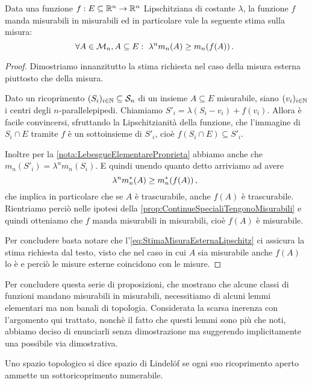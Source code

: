 \begin{proposition}\label{prop:LipschitzTengonoMisurabili}
	Data una funzione $f:E\subseteq \mathbb R^n\to\mathbb R^n$ Lipschitziana di costante $\lambda$, la funzione $f$ manda misurabili in misurabili ed in particolare vale la seguente stima sulla misura:
	\begin{equation*}
		\forall A\in\mathcal M_n, A\subseteq E:\ \lambda^n m_n(A) \ge m_n(f(A)) \, \text{. }
	\end{equation*}
\end{proposition}
\begin{proof}
	Dimostriamo innanzitutto la stima richiesta nel caso della misura esterna piuttosto che della misura.
	
	Dato un ricoprimento $(S_i)_{i\in\mathbb N}\subseteq \mathcal S_n$ di un insieme $A\subseteq E$ misurabile, siano $(v_i)_{i\in\mathbb N}$ i centri degli $n$-parallelepipedi.
	Chiamiamo $S'_i=\lambda(S_i-v_i)+f(v_i)$.
	Allora è facile convincersi, sfruttando la Lipschitzianità della funzione, che l'immagine di $S_i\cap E$ tramite $f$ è un sottoinsieme di $S'_i$, cioè $f(S_i\cap E)\subseteq S'_i$.
	
	Inoltre per la \cref{nota:LebesgueElementareProprieta} abbiamo anche che $m_n(S'_i)=\lambda^n m_n(S_i)$. 
	E quindi unendo quanto detto arriviamo ad avere
	\begin{equation}\label{eq:StimaMisuraEsternaLipschitz}
		\lambda^n m_n^*(A) \ge m_n^*(f(A))  \, \text{, }
	\end{equation}
	che implica in particolare che se $A$ è trascurabile, anche $f(A)$ è trascurabile.
	Rientriamo perciò nelle ipotesi della \cref{prop:ContinueSpecialiTengonoMisurabili} e quindi otteniamo che $f$ manda misurabili in misurabili, cioè $f(A)$ è misurabile.
	
	Per concludere basta notare che l'\cref{eq:StimaMisuraEsternaLipschitz} ci assicura la stima richiesta dal testo, visto che nel caso in cui $A$ sia misurabile anche $f(A)$ lo è e perciò le misure esterne coincidono con le misure.
\end{proof}

Per concludere questa serie di proposizioni, che mostrano che alcune classi di funzioni mandano misurabili in misurabili, necessitiamo di alcuni lemmi elementari ma non banali di topologia.
Considerata la scarsa inerenza con l'argomento qui trattato, nonchè il fatto che questi lemmi sono più che noti, abbiamo deciso di enunciarli senza dimostrazione ma suggerendo implicitamente una possibile via dimostrativa.

\begin{definition}\label{def:Lindelof}
	Uno spazio topologico si dice spazio di Lindelöf se ogni suo ricoprimento aperto ammette un sottoricoprimento numerabile. 
\end{definition}

